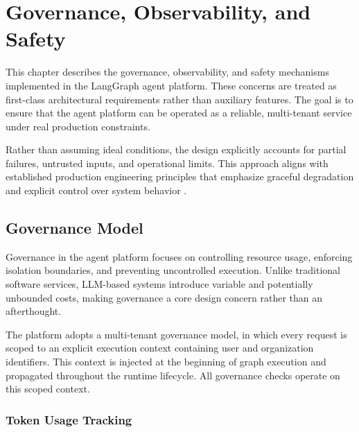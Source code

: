 \chapter{Governance, Observability, and Safety}
\label{ch:GovernanceObservability}

This chapter describes the governance, observability, and safety mechanisms
implemented in the LangGraph agent platform. These concerns are treated as
first-class architectural requirements rather than auxiliary features. The
goal is to ensure that the agent platform can be operated as a reliable,
multi-tenant service under real production constraints.

Rather than assuming ideal conditions, the design explicitly accounts for
partial failures, untrusted inputs, and operational limits. This approach
aligns with established production engineering principles that emphasize
graceful degradation and explicit control over system behavior
\cite{googleSRE,microsoftWellArchitected}.

\section{Governance Model}
\label{sec:GovernanceModel}

Governance in the agent platform focuses on controlling resource usage,
enforcing isolation boundaries, and preventing uncontrolled execution. Unlike
traditional software services, LLM-based systems introduce variable and
potentially unbounded costs, making governance a core design concern rather
than an afterthought.

The platform adopts a multi-tenant governance model, in which every request is
scoped to an explicit execution context containing user and organization
identifiers. This context is injected at the beginning of graph execution and
propagated throughout the runtime lifecycle. All governance checks operate on
this scoped context.

\subsection{Token Usage Tracking}
\label{sec:TokenTracking}

